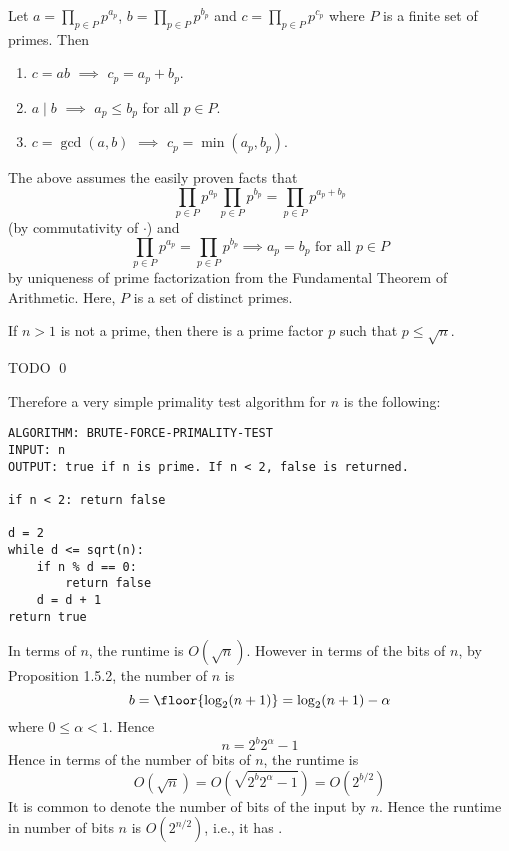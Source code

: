\begin{prop} Let $a = \prod_{p \in P} p^{a_p}$, $b = \prod_{p
    \in P} p^{b_p}$ and $c = \prod_{p \in P} p^{c_p}$
  where $P$ is a finite set of primes. Then
\begin{enumerate}[nosep,label=\textnormal{(\alph*)}]
 \item $c = ab$ $\implies$ $c_p = a_p + b_p$.
 \item $a \mid b$ $\implies$ $a_p \leq b_p$ for all $p \in P$.
 \item $c = \gcd(a,b)$ $\implies$ $c_p = \min(a_p, b_p)$.
\end{enumerate}
\end{prop}

The above assumes the easily proven facts that
\[
\prod_{p \in P} p^{a_p}
\prod_{p \in P} p^{b_p}
=
\prod_{p \in P} p^{a_p + b_p}
\]
(by commutativity of $\cdot$) and
\[
\prod_{p \in P} p^{a_p}
=
\prod_{p \in P} p^{b_p}
\implies
a_p = b_p \text{ for all $p \in P$}
\]
by uniqueness of prime factorization from the Fundamental Theorem of Arithmetic.
Here, $P$ is a set of distinct primes.


\begin{prop}
  If $n > 1$ is not a prime, then there is a prime factor $p$ such that
  $p \leq \sqrt{n}$.
\end{prop}
\proof
TODO
\qed

Therefore a very simple primality test algorithm for $n$ is the following:
  
\begin{Verbatim}[fontsize=\footnotesize,frame=single]
ALGORITHM: BRUTE-FORCE-PRIMALITY-TEST
INPUT: n
OUTPUT: true if n is prime. If n < 2, false is returned.

if n < 2: return false

d = 2
while d <= sqrt(n):
    if n % d == 0:
        return false
    d = d + 1
return true
\end{Verbatim}

In terms of $n$, the runtime is $O(\sqrt{n})$.
However in terms of the bits of $n$, by Proposition 1.5.2,
the number of $n$ is
\[
b = \floor{\log_2 ( n + 1 )} = \log_2(n + 1) - \alpha
\]
where $0 \leq \alpha < 1$.
Hence
\[
n = 2^b2^\alpha - 1
\]
Hence in terms of the number of bits of $n$,
the runtime is
\[
O(\sqrt{n}) = O(\sqrt{2^b2^\alpha - 1}) = O(2^{b/2})
\]
It is common to denote the number of bits of the input by $n$.
Hence the runtime in number of bits $n$ is
$O(2^{n/2})$, i.e., it has .

